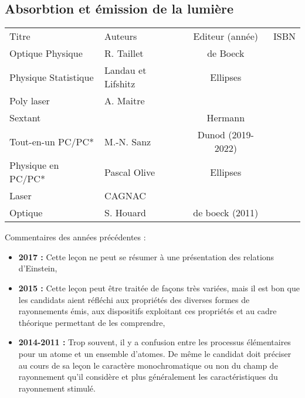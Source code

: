 \begin{headerBlock}
  \chapter{Absorbtion et émission de la lumière}
    \label{LP_Absorption}
\end{headerBlock}

\begin{center}
\begin{tabularx}{\textwidth}{| X | X | c | c |}
  \hline
  \rowcolor{gray!20}\multicolumn{4}{c}{Bibliographie de la leçon : } \\
  \hline 
  Titre & Auteurs & Editeur (année) & ISBN \\
  \hline
  Optique Physique & R. Taillet & de Boeck &   \\
  \hline 
  Physique Statistique & Landau et Lifshitz & Ellipses &  \\
 \hline 
   Poly laser & A. Maitre &  &  \\
 \hline
  Sextant & & Hermann & \\
 \hline 
 Tout-en-un PC/PC* & M.-N. Sanz & Dunod (2019-2022) & \\
 \hline 
 Physique en PC/PC* & Pascal Olive & Ellipses & \\
 \hline
 Laser & CAGNAC & & \\
 \hline
 Optique & S. Houard & de boeck (2011) & \\
 \hline
\end{tabularx}
\end{center}

\begin{reportBlock}{Commentaires des années précédentes :}
    \begin{itemize}
        \item \textbf{2017 :} Cette leçon ne peut se résumer à une présentation des relations d’Einstein,
        \item \textbf{2015 :} Cette leçon peut être traitée de façons très variées, mais il est bon que les candidats aient réfléchi aux propriétés des diverses formes de rayonnements émis, aux dispositifs exploitant ces propriétés et au cadre théorique permettant de les comprendre,
        \item \textbf{2014-2011 : }Trop souvent, il y a confusion entre les processus élémentaires pour un atome et un ensemble d’atomes. De même le candidat doit préciser au cours de sa leçon le caractère monochromatique ou non du champ de rayonnement qu’il considère et plus généralement les caractéristiques du rayonnement stimulé.
    \end{itemize}
\end{reportBlock}

